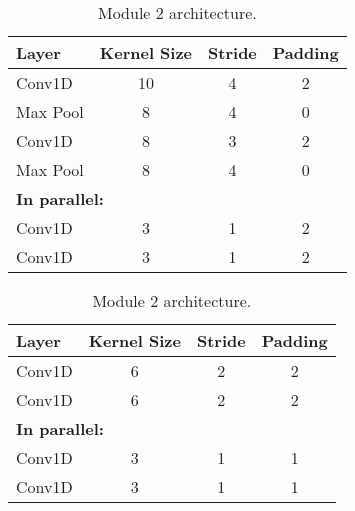 \newcommand\nocell[1]{\multicolumn{#1}{c|}{}}
\setcellgapes{2pt}

\begin{table}[htbp]
	\centering
	\begin{minipage}{0.45\textwidth}
		\centering
		\begin{tabular}{|l|c|c|c|}
			\hline
			\textbf{Layer} & \textbf{Kernel Size} & \textbf{Stride} & \textbf{Padding} \\ \hline
			Conv1D         & 10                   & 4               & 2                \\ \hline
			Max Pool       & 8                    & 4               & 0                \\ \hline
			Conv1D         & 8                    & 3               & 2                \\ \hline
			Max Pool       & 8                    & 4               & 0                \\ \hline
			\multicolumn{4}{|l|}{\textbf{In parallel:}}									\\ \hline
			Conv1D         & 3                    & 1               & 2                \\ \hline
			Conv1D         & 3                    & 1               & 2                \\ \hline
		\end{tabular}
		\caption{Module 1 architecture.}
		\label{tab:architecure-module-1}
	\end{minipage}
	\hfill
	\begin{minipage}{0.45\textwidth}
		\centering
		\begin{tabular}{|l|c|c|c|}
			\hline
			\textbf{Layer} & \textbf{Kernel Size} & \textbf{Stride} & \textbf{Padding} \\ \hline
			Conv1D         & 6                    & 2               & 2                \\ \hline
			Conv1D         & 6                    & 2               & 2                \\ \hline
			\multicolumn{4}{|l|}{\textbf{In parallel:}}									\\ \hline
			Conv1D         & 3                    & 1              & 1                \\ \hline
			Conv1D         & 3                    & 1               & 1                \\ \hline
		\end{tabular}
		\caption{Module 2 architecture.}
		\label{tab:architecure-module-2}
	\end{minipage}
\end{table}